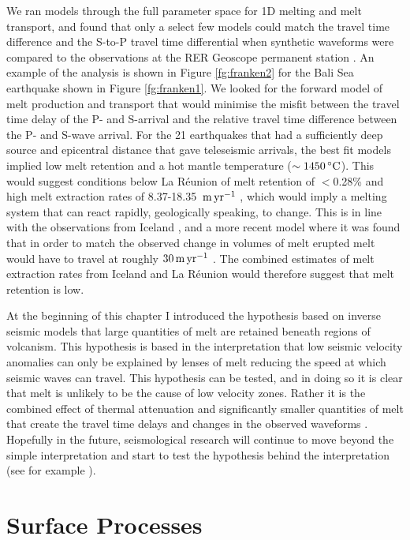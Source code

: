 We ran models through the full parameter space for 1D melting and melt transport, and found that only a select few models could match the travel time difference and the S-to-P travel time differential when synthetic waveforms were compared to the observations at the RER Geoscope permanent station \citep{franken-etal-2020}. An example of the analysis is shown in Figure \ref{fg:franken2} for the Bali Sea earthquake shown in Figure \ref{fg:franken1}. We looked for the forward model of melt production and transport that would minimise the misfit between the travel time delay of the P- and S-arrival and the relative travel time difference between the P- and S-wave arrival. For the 21 earthquakes that had a sufficiently deep source and epicentral distance that gave teleseismic arrivals, the best fit models implied low melt retention and a hot mantle temperature ($\sim 1450\rm\,^{\circ}C$). This would suggest conditions below La Réunion of melt retention of $<$0.28\% and high melt extraction rates of 8.37-18.35 $\rm\,m\,yr^{-1}$ \citep{franken-etal-2020}, which would imply a melting system that can react rapidly, geologically speaking, to change. This is in line with the observations from Iceland \citep{armitage-etal-grl-2019}, and a more recent model where it was found that in order to match the observed change in volumes of melt erupted melt would have to travel at roughly $30\rm\,m\,yr^{-1}$ \citep{jones-2020}. The combined estimates of melt extraction rates from Iceland and La Réunion would therefore suggest that melt retention is low.

At the beginning of this chapter I introduced the hypothesis based on inverse seismic models that large quantities of melt are retained beneath regions of volcanism. This hypothesis is based in the interpretation that low seismic velocity anomalies can only be explained by lenses of melt reducing the speed at which seismic waves can travel. This hypothesis can be tested, and in doing so it is clear that melt is unlikely to be the cause of low velocity zones. Rather it is the combined effect of thermal attenuation and significantly smaller quantities of melt that create the travel time delays and changes in the observed waveforms \citep[e.g.][]{goes-etal-2012,armitage-etal-epsl-2015,armitage-etal-grl-2019,franken-etal-2020}. Hopefully in the future, seismological research will continue to move beyond the simple interpretation and start to test the hypothesis behind the interpretation (see for example \citealp{maguire-etal-2018}).

\section{Surface Processes}


